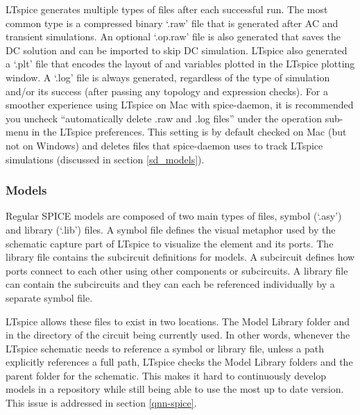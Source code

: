 \documentclass{article}
\newcommand{\todoidea}[2][]{\todo[color=green!40, #1]{\textbf{idea:}\\#2}}
\newcommand{\ccf}[1]{`\textsf{#1}'}
\begin{document}
LTspice generates multiple types of files after each successful run. The most common type is 
a compressed binary \ccf{.raw} file that is generated after AC and transient simulations. An
optional \ccf{.op.raw} file is also generated that saves the DC solution and can be imported
to skip DC simulation. LTspice also generated a \ccf{.plt} file that encodes the layout of and
variables plotted in the LTspice plotting window. A \ccf{.log} file is always generated, 
regardless of the type of simulation and/or its success (after passing any topology and 
expression checks). For a smoother experience using LTspice on Mac with spice-daemon, it is
recommended you uncheck ``automatically delete .raw and .log files'' under the operation sub-menu
in the LTspice preferences. This setting is by default checked on Mac (but not on Windows) and
deletes files that spice-daemon uses to track LTspice simulations (discussed in section \ref{sd_models}).

\subsubsection{Models}

Regular SPICE models are composed of two main types of files, symbol (\ccf{.asy}) and library
(\ccf{.lib}) files. A symbol file defines the visual metaphor used by the schematic capture
part of LTspice to visualize the element and its ports. The library file contains the subcircuit
definitions for models. A subcircuit defines how ports connect to each other using other components
or subcircuits. A library file can contain the subcircuits and they can each be referenced individually
by a separate symbol file.

LTspice allows these files to exist in two locations. The Model Library folder and in the directory of the
circuit being currently used. In other words, whenever the LTspice schematic needs to reference a symbol or
library file, unless a path explicitly references a full path, LTspice checks the Model Library folders 
and the parent folder for the schematic. This makes it hard to continuously develop models in a repository
while still being able to use the most up to date version. This issue is addressed in section \ref{qnn-spice}.


\end{document}

